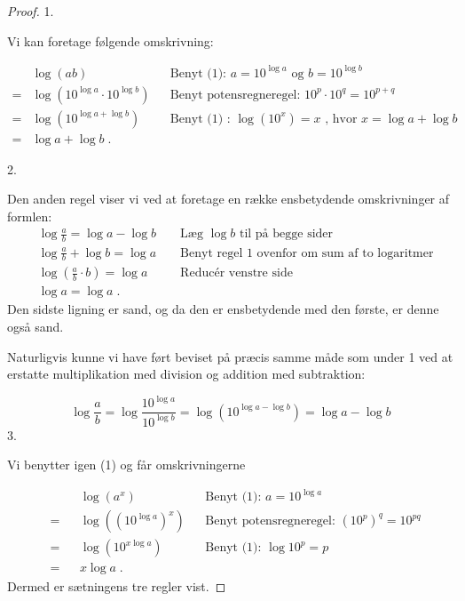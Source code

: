 \documentclass[12pt,oneside,a4paper]{article}
\theoremstyle{plain}
\begin{document}
\begin{proof}

1.

Vi kan foretage følgende omskrivning:

\[
\begin{aligned}
    &\log (ab)& &\text{Benyt (1): } a = 10^{\log a} \text{ og } b = 10^{\log b} \\
    =&\log (10^{\log a} \cdot 10^{\log b}) && \text{Benyt potensregneregel: } 10^p \cdot 10^q = 10^{p + q} \\
    =& \log(10^{\log a + \log b}) &&\text{Benyt (1) : } \log(10^x) = x \text{ , hvor } x = \log a + \log b \\
    =& \log a + \log b \; . 
\end{aligned}
\]

2.

Den anden regel viser vi ved at foretage en række ensbetydende omskrivninger af formlen:
\[
\begin{aligned}
    &\log \frac{a}{b} = \log a - \log b &&\text{ Læg } \log b \text{ til på begge sider } \\ 
    &\log \frac{a}{b} + \log b = \log a &&\text{ Benyt regel 1 ovenfor om sum af to logaritmer} \\ 
    &\log \left( \frac{a}{b} \cdot b \right) = \log a &&\text{ Reducér venstre side } \\ 
    &\log a = \log a \;
. \end{aligned}
\]
Den sidste ligning er sand, og da den er ensbetydende med den første, er denne
også sand.

Naturligvis kunne vi have ført beviset på præcis samme måde som under 1 ved at
erstatte multiplikation med division og addition med subtraktion:

\[
    \log \frac{a}{b} = \log \frac{10^{\log a}}{10^{\log b}} = \log (10^{\log a - \log b}) = \log a - \log b
\]
3.

Vi benytter igen (1) og får omskrivningerne

\[
\begin{aligned}
    &&&\log (a^x) &&\text{Benyt (1): } a = 10^{\log a} \\
    &= &&\log ({(10^{\log a})}^x) &&\text{Benyt potensregneregel: } (10^p)^q = 10^ {pq} \\
    &= &&\log (10^{x \log a}) &&\text{Benyt (1): } \log 10^p = p \\
    &= &&x \log a \; .
\end{aligned}
\]
Dermed er sætningens tre regler vist.
\end{proof}
\end{document}
